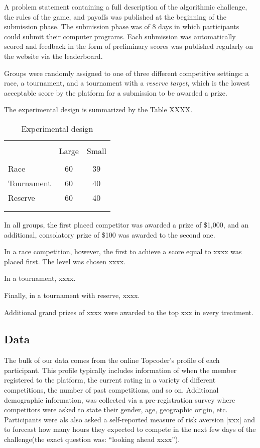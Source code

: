 \documentclass[12pt,]{article}
\begin{document}
A problem statement containing a full description of the algorithmic
challenge, the rules of the game, and payoffs was published at the
beginning of the submission phase. The submission phase was of 8 days in
which participants could submit their computer programs. Each submission
was automatically scored and feedback in the form of preliminary scores
was published regularly on the website via the leaderboard.

Groups were randomly assigned to one of three different competitive
settings: a race, a tournament, and a tournament with a \emph{reserve
target}, which is the lowest acceptable score by the platform for a
submission to be awarded a prize.

The experimental design is summarized by the Table XXXX.

\begin{table}
\centering
\caption{Experimental design}
\label{tab: experimental design}
\begin{tabular}{@{}lcc}
  \\[-1.8ex]\hline \hline \\[-1.8ex]
 & Large & Small \\ 
  \hline \\[-1.86ex]
Race & 60 & 39 \\ 
  Tournament & 60 & 40 \\ 
  Reserve & 60 & 40 \\ 
   \\[-1.8ex]\hline \hline \\[-1.8ex]
\end{tabular}
\end{table}

In all groups, the first placed competitor was awarded a prize of
\$1,000, and an additional, consolatory prize of \$100 was awarded to
the second one.

In a race competition, however, the first to achieve a score equal to
xxxx was placed first. The level was chosen xxxx.

In a tournament, xxxx.

Finally, in a tournament with reserve, xxxx.

Additional grand prizes of xxxx were awarded to the top xxx in every
treatment.

\subsection{Data}\label{data}

The bulk of our data comes from the online Topcoder's profile of each
participant. This profile typically includes information of when the
member registered to the platform, the current rating in a variety of
different competitions, the number of past competitions, and so on.
Additional demographic information, was collected via a pre-registration
survey where competitors were asked to state their gender, age,
geographic origin, etc. Participants were als also asked a self-reported
measure of risk aversion {[}xxx{]} and to forecast how many hours they
expected to compete in the next few days of the challenge(the exact
question was: ``looking ahead xxxx'').
\end{document}
